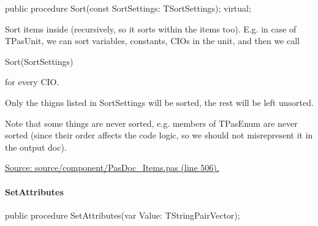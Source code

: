 \documentclass{report}
\newif\ifpdf
\begin{document}
\label{PasDoc_Items.TPasItem-Sort}
\begin{list}{}{
\setlength{\itemindent}{0cm}
\setlength{\listparindent}{0cm}
\setlength{\leftmargin}{\evensidemargin}
\addtolength{\leftmargin}{\tmplength}
\settowidth{\labelsep}{X}
\addtolength{\leftmargin}{\labelsep}
\setlength{\labelwidth}{\tmplength}
}
\item[\textbf{Declaration}\hfill]
\ifpdf
\begin{flushleft}
\fi
\begin{ttfamily}
public procedure Sort(const SortSettings: TSortSettings); virtual;\end{ttfamily}

\ifpdf
\end{flushleft}
\fi

\par
\item[\textbf{Description}]
Sort items inside (recursively, so it sorts within the items too). E.g. in case of TPasUnit, we can sort variables, constants, CIOs in the unit, and then we call \begin{ttfamily}Sort(SortSettings)\end{ttfamily} for every CIO.

Only the thigns listed in SortSettings will be sorted, the rest will be left unsorted.

Note that some things are never sorted, e.g. members of TPasEnum are never sorted (since their order affects the code logic, so we should not misrepresent it in the output doc).\par
\href{https://github.com/pasdoc/pasdoc/blob/master/source/component/PasDoc_Items.pas#L506}{Source: source/component/PasDoc{\_}Items.pas (line 506).}

\end{list}
\paragraph*{SetAttributes}\hspace*{\fill}

\label{PasDoc_Items.TPasItem-SetAttributes}
\begin{list}{}{
\setlength{\itemindent}{0cm}
\setlength{\listparindent}{0cm}
\setlength{\leftmargin}{\evensidemargin}
\addtolength{\leftmargin}{\tmplength}
\settowidth{\labelsep}{X}
\addtolength{\leftmargin}{\labelsep}
\setlength{\labelwidth}{\tmplength}
}
\item[\textbf{Declaration}\hfill]
\ifpdf
\begin{flushleft}
\fi
\begin{ttfamily}
public procedure SetAttributes(var Value: TStringPairVector);\end{ttfamily}

\ifpdf
\end{flushleft}
\fi

\end{list}
\end{document}
